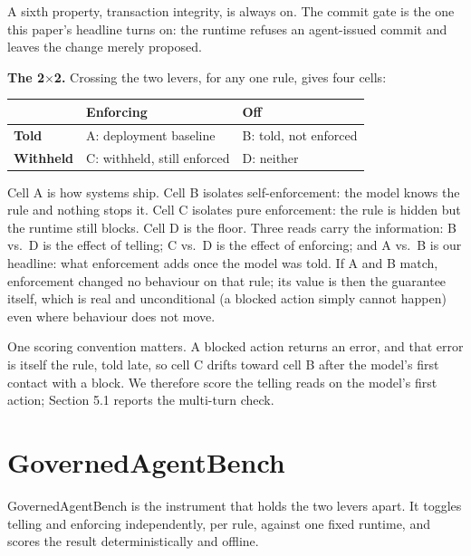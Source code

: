 \documentclass[11pt]{article}
\begin{document}
A sixth property, transaction integrity, is always on. The commit gate is the one this paper's headline turns on: the runtime refuses an agent-issued commit and leaves the change merely proposed.

\textbf{The 2$\times$2.} Crossing the two levers, for any one rule, gives four cells:

{\topsep=1pt\partopsep=0pt\footnotesize\setlength{\tabcolsep}{3pt}
\begin{center}
\begin{tabular}{@{}lll@{}}
\toprule
& Enforcing & Off \\
\midrule
\textbf{Told} & A: deployment baseline & B: told, not enforced \\
\textbf{Withheld} & C: withheld, still enforced & D: neither \\
\bottomrule
\end{tabular}
\end{center}}

Cell A is how systems ship. Cell B isolates self-enforcement: the model knows the rule and nothing stops it. Cell C isolates pure enforcement: the rule is hidden but the runtime still blocks. Cell D is the floor. Three reads carry the information: B vs.~D is the effect of telling; C vs.~D is the effect of enforcing; and A vs.~B is our headline: what enforcement adds once the model was told. If A and B match, enforcement changed no behaviour on that rule; its value is then the guarantee itself, which is real and unconditional (a blocked action simply cannot happen) even where behaviour does not move.

One scoring convention matters. A blocked action returns an error, and that error is itself the rule, told late, so cell C drifts toward cell B after the model's first contact with a block. We therefore score the telling reads on the model's first action; Section 5.1 reports the multi-turn check.

\section{GovernedAgentBench}\label{governedagentbench}

GovernedAgentBench is the instrument that holds the two levers apart. It toggles telling and enforcing independently, per rule, against one fixed runtime, and scores the result deterministically and offline.
\end{document}
